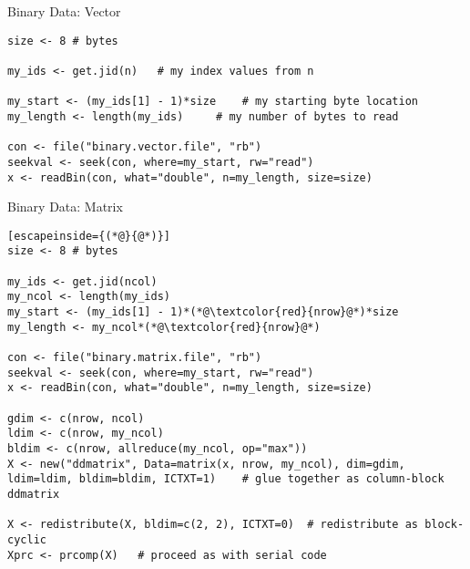 \begin{frame}[fragile]
  \begin{exampleblock}{Binary Data: Vector}\pause
    \begin{lstlisting}
size <- 8 # bytes

my_ids <- get.jid(n)   # my index values from n

my_start <- (my_ids[1] - 1)*size    # my starting byte location
my_length <- length(my_ids)     # my number of bytes to read

con <- file("binary.vector.file", "rb")
seekval <- seek(con, where=my_start, rw="read")
x <- readBin(con, what="double", n=my_length, size=size)
    \end{lstlisting}
  \end{exampleblock}
\end{frame}

\begin{frame}[fragile]
  \begin{exampleblock}{Binary Data: Matrix}\pause \vspace{-0.8ex}
    \begin{lstlisting}[escapeinside={(*@}{@*)}]
size <- 8 # bytes

my_ids <- get.jid(ncol)
my_ncol <- length(my_ids)
my_start <- (my_ids[1] - 1)*(*@\textcolor{red}{nrow}@*)*size
my_length <- my_ncol*(*@\textcolor{red}{nrow}@*)

con <- file("binary.matrix.file", "rb")
seekval <- seek(con, where=my_start, rw="read")
x <- readBin(con, what="double", n=my_length, size=size)

gdim <- c(nrow, ncol)
ldim <- c(nrow, my_ncol)
bldim <- c(nrow, allreduce(my_ncol, op="max"))
X <- new("ddmatrix", Data=matrix(x, nrow, my_ncol), dim=gdim, ldim=ldim, bldim=bldim, ICTXT=1)    # glue together as column-block ddmatrix

X <- redistribute(X, bldim=c(2, 2), ICTXT=0)  # redistribute as block-cyclic
Xprc <- prcomp(X)   # proceed as with serial code
    \end{lstlisting}
  \end{exampleblock}
\end{frame}


